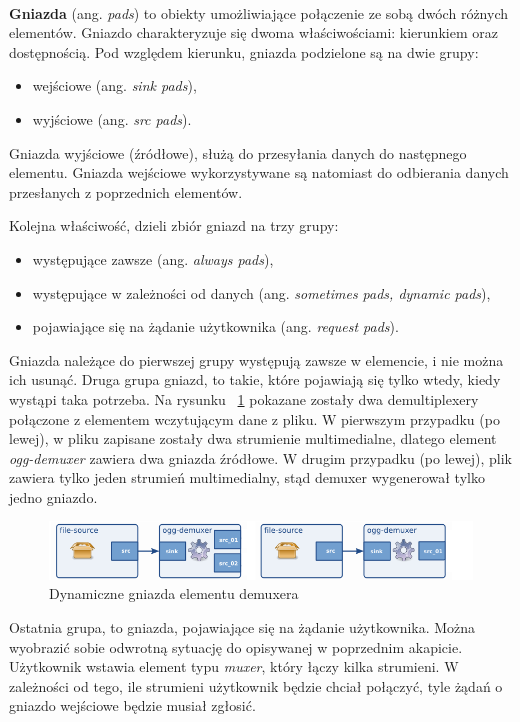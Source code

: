\documentclass[12pt]{article}
\begin{document}
\paragraph{}
\textbf{Gniazda} (ang. \textit{pads}) to obiekty umożliwiające połączenie ze sobą dwóch różnych elementów. Gniazdo charakteryzuje się dwoma właściwościami: kierunkiem oraz dostępnością. Pod względem kierunku, gniazda podzielone są na dwie grupy:
\begin{itemize}
 \setlength{\itemsep}{0em}
  \item wejściowe (ang. \textit{sink pads}),
  \item wyjściowe (ang. \textit{src pads}).
\end{itemize}

Gniazda wyjściowe (źródłowe), służą do przesyłania danych do następnego elementu. Gniazda wejściowe wykorzystywane są natomiast do odbierania danych przesłanych z poprzednich elementów.

Kolejna właściwość, dzieli zbiór gniazd na trzy grupy:
\begin{itemize}
 \setlength{\itemsep}{0em}
  \item występujące zawsze (ang. \textit{always pads}),
  \item występujące w zależności od danych (ang. \textit{sometimes pads, dynamic pads}),
  \item pojawiające się na żądanie użytkownika (ang. \textit{request pads}).
\end{itemize}

Gniazda należące do pierwszej grupy występują zawsze w elemencie, i nie można ich usunąć.
Druga grupa gniazd, to takie, które pojawiają się tylko wtedy, kiedy wystąpi taka potrzeba. Na rysunku ~\ref{fig:requestPadsDemux} pokazane zostały dwa demultiplexery połączone z elementem wczytującym dane z pliku. W pierwszym przypadku (po lewej), w pliku zapisane zostały dwa strumienie multimedialne, dlatego element \textit{ogg-demuxer} zawiera dwa gniazda źródłowe. W drugim przypadku (po lewej), plik zawiera tylko jeden strumień multimedialny, stąd demuxer wygenerował tylko jedno gniazdo.
\begin{figure}[H]
  \includegraphics[width=150mm]{img/request-pads-demux.png}
  \caption{Dynamiczne gniazda elementu demuxera \cite{gstmainpage}}
  \label{fig:requestPadsDemux}
\end{figure}
Ostatnia grupa, to gniazda, pojawiające się na żądanie użytkownika. Można wyobrazić sobie odwrotną sytuację do opisywanej w poprzednim akapicie. Użytkownik wstawia element typu \textit{muxer}, który łączy kilka strumieni. W zależności od tego, ile strumieni użytkownik będzie chciał połączyć, tyle żądań o gniazdo wejściowe będzie musiał zgłosić.
\end{document}
